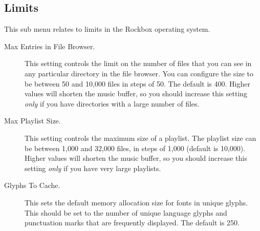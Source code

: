 \subsection{Limits}
This sub menu relates to limits in the Rockbox operating system.
  \begin{description}
    \item [Max Entries in File Browser.] This setting controls the limit on
    the number of files that you can see in any particular directory in the
    file browser. You can configure the size to be between 50 and
    10,000 files in steps of 50. The default is 400. Higher values will shorten
    the music buffer, so you should increase this setting \emph{only} if you have
    directories with a large number of files.

    \item [Max Playlist Size.] This setting controls the maximum size of
    a playlist. The playlist size can be between 1,000 and 32,000 files,
    in steps of 1,000 (default is 10,000). Higher values will shorten the
    music buffer, so you should increase this setting \emph{only} if you
    have very large playlists.

    \item [Glyphs To Cache.] This sets the default memory allocation size
    for fonts in unique glyphs. This should be set to the number of unique
    language glyphs and punctuation marks that are frequently displayed.
    The default is 250.
  \end{description}
